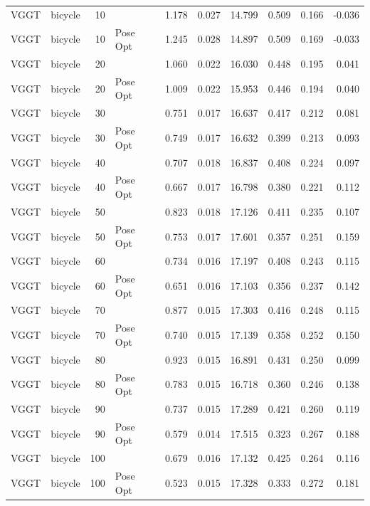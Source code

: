 \begin{table}[H]
\begin{tabular}{llrlrrrrrr}
VGGT & bicycle & 10 &  & 1.178 & 0.027 & 14.799 & 0.509 & 0.166 & -0.036 \\
VGGT & bicycle & 10 & Pose Opt & 1.245 & 0.028 & 14.897 & 0.509 & 0.169 & -0.033 \\
VGGT & bicycle & 20 &  & 1.060 & 0.022 & 16.030 & 0.448 & 0.195 & 0.041 \\
VGGT & bicycle & 20 & Pose Opt & 1.009 & 0.022 & 15.953 & 0.446 & 0.194 & 0.040 \\
VGGT & bicycle & 30 &  & 0.751 & 0.017 & 16.637 & 0.417 & 0.212 & 0.081 \\
VGGT & bicycle & 30 & Pose Opt & 0.749 & 0.017 & 16.632 & 0.399 & 0.213 & 0.093 \\
VGGT & bicycle & 40 &  & 0.707 & 0.018 & 16.837 & 0.408 & 0.224 & 0.097 \\
VGGT & bicycle & 40 & Pose Opt & 0.667 & 0.017 & 16.798 & 0.380 & 0.221 & 0.112 \\
VGGT & bicycle & 50 &  & 0.823 & 0.018 & 17.126 & 0.411 & 0.235 & 0.107 \\
VGGT & bicycle & 50 & Pose Opt & 0.753 & 0.017 & 17.601 & 0.357 & 0.251 & 0.159 \\
VGGT & bicycle & 60 &  & 0.734 & 0.016 & 17.197 & 0.408 & 0.243 & 0.115 \\
VGGT & bicycle & 60 & Pose Opt & 0.651 & 0.016 & 17.103 & 0.356 & 0.237 & 0.142 \\
VGGT & bicycle & 70 &  & 0.877 & 0.015 & 17.303 & 0.416 & 0.248 & 0.115 \\
VGGT & bicycle & 70 & Pose Opt & 0.740 & 0.015 & 17.139 & 0.358 & 0.252 & 0.150 \\
VGGT & bicycle & 80 &  & 0.923 & 0.015 & 16.891 & 0.431 & 0.250 & 0.099 \\
VGGT & bicycle & 80 & Pose Opt & 0.783 & 0.015 & 16.718 & 0.360 & 0.246 & 0.138 \\
VGGT & bicycle & 90 &  & 0.737 & 0.015 & 17.289 & 0.421 & 0.260 & 0.119 \\
VGGT & bicycle & 90 & Pose Opt & 0.579 & 0.014 & 17.515 & 0.323 & 0.267 & 0.188 \\
VGGT & bicycle & 100 &  & 0.679 & 0.016 & 17.132 & 0.425 & 0.264 & 0.116 \\
VGGT & bicycle & 100 & Pose Opt & 0.523 & 0.015 & 17.328 & 0.333 & 0.272 & 0.181 \\
\bottomrule
\end{tabular}
\end{table}